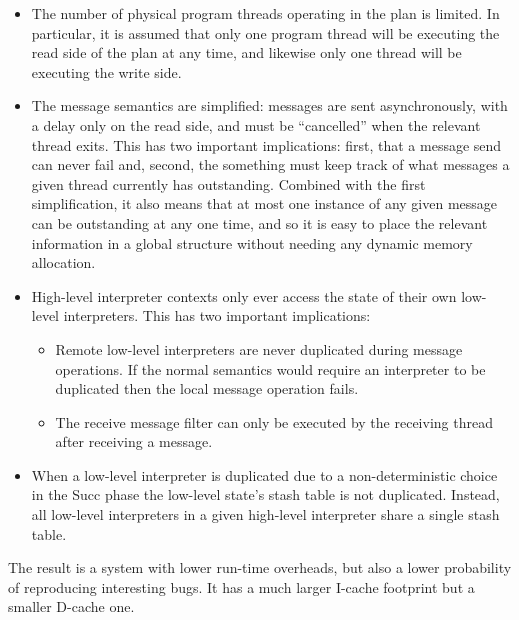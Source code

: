 \begin{itemize}
\item
  The number of physical program threads operating in the plan is limited.
  In particular, it is assumed that only one program thread will be executing the read side of the plan at any time, and likewise only one thread will be executing the write side.
\item
  The message semantics are simplified: messages are sent asynchronously, with a delay only on the read side, and must be ``cancelled'' when the relevant thread exits.
  This has two important implications: first, that a message send can never fail and, second, the something must keep track of what messages a given thread currently has outstanding.
  Combined with the first simplification, it also means that at most one instance of any given message can be outstanding at any one time, and so it is easy to place the relevant information in a global structure without needing any dynamic memory allocation.
\item
  High-level interpreter contexts only ever access the state of their own low-level interpreters.
  This has two important implications:

  \begin{itemize}
  \item
    Remote low-level interpreters are never duplicated during message operations.
    If the normal semantics would require an interpreter to be duplicated then the local message operation fails.
  \item
    The receive message filter can only be executed by the receiving thread after receiving a message.
  \end{itemize}
\item
  When a low-level interpreter is duplicated due to a non-deterministic choice in the Succ phase the low-level state's stash table is not duplicated.
  Instead, all low-level interpreters in a given high-level interpreter share a single stash table.
\end{itemize}

The result is a system with lower run-time overheads, but also a lower probability of reproducing interesting bugs.
It has a much larger I-cache footprint but a smaller D-cache one.

